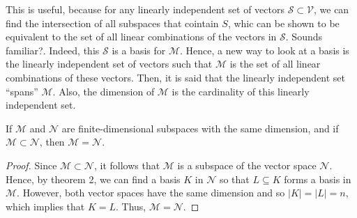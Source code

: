 \documentclass[12pt]{article}
\newenvironment{problem}[2][Problem]{\begin{trivlist} \item[\hskip \labelsep {\bfseries #1}\hskip \labelsep {\bfseries #2.}]}{\end{trivlist}}
\begin{document}
This is useful, because for any linearly independent set of vectors $\mathcal{S}\subset \mathcal{V}$, we can find the intersection of all subspaces that cointain $S$, whic can be shown to be equivalent to the set of all linear combinations of the vectors in $\mathcal{S}$. Sounds familiar?. Indeed, this $\mathcal{S}$ is a basis for $\mathcal{M}$. Hence, a new way to look at a basis is the linearly independent set of vectors such that $\mathcal{M}$ is the set of all linear combinations of these vectors. Then, it is said that the linearly independent set ``spans'' $\mathcal{M}$. Also, the dimension of $\mathcal{M}$ is the cardinality of this linearly independent set. 
\begin{problem}{1}
  If $\mathcal{M}$ and $\mathcal{N}$ are finite-dimensional subspaces with the same dimension, and if $\mathcal{M}\subset \mathcal{N}$, then $\mathcal{M}=\mathcal{N}$.
\begin{proof}
 Since $\mathcal{M}\subset \mathcal{N}$, it follows that $\mathcal{M}$ is a subspace of the vector space $\mathcal{N}$. Hence, by theorem 2, we can find a basis $K$ in $\mathcal{N}$ so that $L\subseteq K$ forms a basis in $\mathcal{M}$. However, both vector spaces have the same dimension and so $|K|=|L|=n$, which implies that $K=L$. Thus, $\mathcal{M}=\mathcal{N}$.
\end{proof}
\end{problem}
\end{document}
